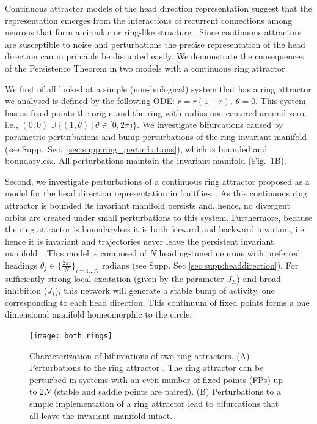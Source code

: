 \documentclass{article} %
\newcounter{ct}
\theoremstyle{definition}
\theoremstyle{remark}
\begin{document}
Continuous attractor models of the head direction representation suggest that the representation emerges from the interactions of recurrent connections among neurons that form a circular or ring-like structure \citep{zhang1996, Noorman2022, ajabi2023}. 
Since continuous attractors are susceptible to noise and perturbations the precise representation of the head direction can in principle be disrupted easily.
We demonstrate the consequences of the Persistence Theorem in two models with a continuous ring attractor.

We first of all looked at a simple (non-biological) system that has a ring attractor we analysed is defined by the following ODE: $\dot r = r(1-r), \ \dot \theta = 0.$
This system has as fixed points the origin and the ring with radius one centered around zero, i.e., $(0,0)\cup\{(1,\theta)\ |\ \theta\in[0,2\pi)\}$. We investigate bifurcations caused by parametric perturbations and bump perturbations of the ring invariant manifold (see Supp.~Sec.~\ref{sec:supp:ring_perturbations}), which is bounded and boundaryless.
All perturbations maintain the invariant manifold (Fig.~\ref{fig:both_rings}B).

Second, we investigate perturbations of a continuous ring attractor proposed as a model for the head direction representation in fruitflies~\citep{Noorman2022}.
As this continuous ring attractor is bounded its invariant manifold persists and, hence, no divergent orbits are created under small perturbations to this system. 
Furthermore, because the ring attractor is boundaryless it is both forward and backward invariant, i.e. hence it is invariant and trajectories never leave the persistent invariant manifold~\citep{wiggins1994}.
This model is composed of $N$ heading-tuned neurons  with preferred headings $\theta_j \in \{\frac{2\pi i}{N}\}_{i=1\dots N}$ radians (see Supp. Sec \ref{sec:supp:headdirection}).
For sufficiently strong local excitation (given by the parameter $J_E$) and broad inhibition ($J_I$), this network will generate a stable bump of activity, one corresponding to each head direction. This continuum of fixed points forms a one dimensional manifold homeomorphic to the circle. 

\begin{figure}[tbhp]
     \centering
  \texttt{[image: both\_rings]}
       \caption{Characterization of bifurcations of two ring attractors. 
       (A)       Perturbations to the ring attractor \citep{Noorman2022}. The ring attractor can be perturbed in systems with an even number of fixed points (FPs)  up to $2N$ (stable and saddle points are paired). 
       (B) Perturbations to a simple implementation of a ring attractor lead to bifurcations that all leave the invariant manifold intact.
       }
         \label{fig:both_rings}
\end{figure}
\end{document}
